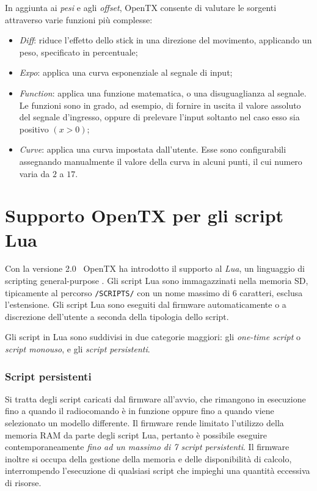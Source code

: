 \documentclass[a4paper, 12pt]{report} %
\begin{document}
In aggiunta ai \emph{pesi} e agli \emph{offset}, OpenTX consente di valutare le sorgenti attraverso varie funzioni più complesse:
\begin{itemize}
        \item \emph{Diff}: riduce l'effetto dello stick in una direzione del movimento, applicando un peso, specificato in percentuale;
        \item \emph{Expo}: applica una curva esponenziale al segnale di input;
        \item \emph{Function}: applica una funzione matematica, o una disuguaglianza al segnale. Le funzioni sono in grado, ad esempio, di fornire in uscita il valore assoluto del segnale d'ingresso, oppure di prelevare l'input soltanto nel caso esso sia positivo $(x>0)$;
        \item \emph{Curve}: applica una curva impostata dall'utente. Esse sono configurabili assegnando manualmente il valore della curva in alcuni punti, il cui numero varia da $2$ a $17$.
\end{itemize}




\section{Supporto OpenTX per gli script Lua}

Con la versione 2.0~\cite{opentx-lua-instructions} OpenTX ha introdotto il supporto al \emph{Lua}, un linguaggio di scripting general-purpose \cite{lua-website}. Gli script Lua sono immagazzinati nella memoria SD, tipicamente al percorso \texttt{/SCRIPTS/} con un nome massimo di 6 caratteri, esclusa l'estensione. Gli script Lua sono eseguiti dal firmware automaticamente o a discrezione dell'utente a seconda della tipologia dello script.

Gli script in Lua sono suddivisi in due categorie maggiori: gli \emph{one-time script} o \emph{script monouso}, e gli \emph{script persistenti}.

\subsubsection{Script persistenti}
Si tratta degli script caricati dal firmware all'avvio, che rimangono in esecuzione fino a quando il radiocomando è in funzione oppure fino a quando viene selezionato un modello differente. Il firmware rende limitato l'utilizzo della memoria RAM da parte degli script Lua, pertanto è possibile eseguire contemporaneamente \emph{fino ad un massimo di 7 script persistenti}. Il firmware inoltre si occupa della gestione della memoria e delle disponibilità di calcolo, interrompendo l'esecuzione di qualsiasi script che impieghi una quantità eccessiva di risorse.
\end{document}
